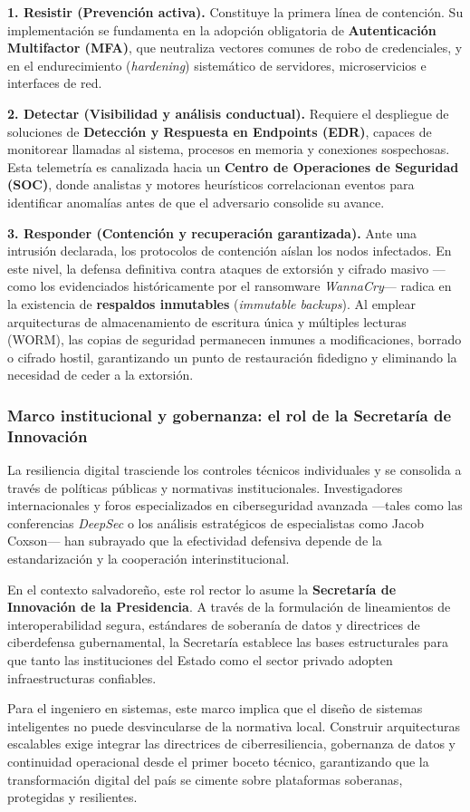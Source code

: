 \textbf{1. Resistir (Prevención activa).} Constituye la primera línea de contención. Su implementación se fundamenta en la adopción obligatoria de \textbf{Autenticación Multifactor (MFA)}, que neutraliza vectores comunes de robo de credenciales, y en el endurecimiento (\textit{hardening}) sistemático de servidores, microservicios e interfaces de red.

\textbf{2. Detectar (Visibilidad y análisis conductual).} Requiere el despliegue de soluciones de \textbf{Detección y Respuesta en Endpoints (EDR)}, capaces de monitorear llamadas al sistema, procesos en memoria y conexiones sospechosas. Esta telemetría es canalizada hacia un \textbf{Centro de Operaciones de Seguridad (SOC)}, donde analistas y motores heurísticos correlacionan eventos para identificar anomalías antes de que el adversario consolide su avance.

\textbf{3. Responder (Contención y recuperación garantizada).} Ante una intrusión declarada, los protocolos de contención aíslan los nodos infectados. En este nivel, la defensa definitiva contra ataques de extorsión y cifrado masivo —como los evidenciados históricamente por el ransomware \textit{WannaCry}— radica en la existencia de \textbf{respaldos inmutables} (\textit{immutable backups}). Al emplear arquitecturas de almacenamiento de escritura única y múltiples lecturas (WORM), las copias de seguridad permanecen inmunes a modificaciones, borrado o cifrado hostil, garantizando un punto de restauración fidedigno y eliminando la necesidad de ceder a la extorsión.

\clearpage
\subsubsection*{\textcolor{unabblue}{}\quad Marco institucional y gobernanza: el rol de la Secretaría de Innovación}
La resiliencia digital trasciende los controles técnicos individuales y se consolida a través de políticas públicas y normativas institucionales. Investigadores internacionales y foros especializados en ciberseguridad avanzada —tales como las conferencias \textit{DeepSec} o los análisis estratégicos de especialistas como Jacob Coxson— han subrayado que la efectividad defensiva depende de la estandarización y la cooperación interinstitucional.

En el contexto salvadoreño, este rol rector lo asume la \textbf{Secretaría de Innovación de la Presidencia}. A través de la formulación de lineamientos de interoperabilidad segura, estándares de soberanía de datos y directrices de ciberdefensa gubernamental, la Secretaría establece las bases estructurales para que tanto las instituciones del Estado como el sector privado adopten infraestructuras confiables.

Para el ingeniero en sistemas, este marco implica que el diseño de sistemas inteligentes no puede desvincularse de la normativa local. Construir arquitecturas escalables exige integrar las directrices de ciberresiliencia, gobernanza de datos y continuidad operacional desde el primer boceto técnico, garantizando que la transformación digital del país se cimente sobre plataformas soberanas, protegidas y resilientes.
